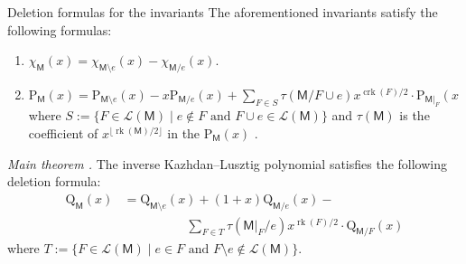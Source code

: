 \documentclass[final]{beamer}
\newlength{\twocolwid}
\newcommand{\M}{\mathsf{M}}
\newcommand{\rank}{\operatorname{rk}}
\newcommand{\corank}{\operatorname{crk}}
\newcommand{\cL}{\mathcal{L}}
\begin{document}
\begin{frame}[t]
\begin{columns}[t]
\begin{column}{\twocolwid}
\vspace{-17mm}
\begin{block}{Deletion formulas for the invariants}
The aforementioned invariants satisfy the following formulas:
\vspace{-10mm}
\begin{enumerate}
    \item $\chi_\M(x) = \chi_{\M\setminus e}(x) - \chi_{\M/e}(x)$.
    \item $\displaystyle\mathrm{P}_\M(x) = \mathrm{P}_{\M\setminus e}(x) - x \mathrm{P}_{\M/e}(x) +
    \sum_{F \in S}{\tau(\M/{F\cup e})x^{\corank(F)/2}\cdot
    \mathrm{P}_{\M|_F}(x)}$
    where $S := \{F \in \cL(\M) \mid e \notin F \text{ and } F \cup e \in \cL(\M)\}$
    and $\tau(\M)$ is the coefficient of $x^{\lfloor\rank(\M)/2\rfloor}$ in the
    \(\mathrm{P}_\M(x)\) \cite{braden-vysogorets}.
\end{enumerate}
\begingroup
{}
\begin{alertblock}{}
    \emph{Main theorem \cite{braden2025inversekazhdanlusztigpolynomialsmatroids}.} 
    The inverse Kazhdan--Lusztig polynomial satisfies the following deletion formula:
    \begin{align*}
    \mathrm{Q}_\M(x)
    & =
    \mathrm{Q}_{\M\setminus e}(x) + (1 + x) \mathrm{Q}_{\M/e}(x) - \\
    &\hspace{5em}\sum_{F \in T}{\tau(\M|_F/ e)x^{\rank(F)/2}\cdot \mathrm{Q}_{\M/F}(x)}
    \end{align*}
    where $T := \{F \in \cL(\M) \mid e \in F \text{ and } F \setminus e \notin \cL(\M)\}$.
\end{alertblock}
\endgroup
\vspace{-10mm}
    \begin{figure}
\end{figure}
\end{block}
\end{column}
\end{columns}
\end{frame}
\end{document}
